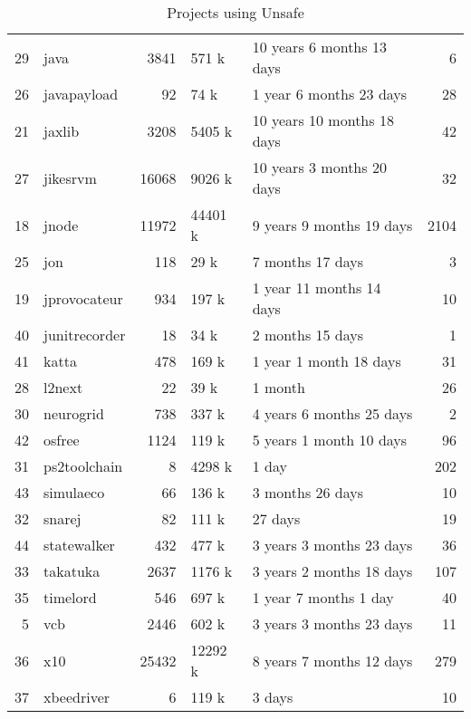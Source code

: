 \begin{table}[ht]
\begin{tabular}{rlrllr}
  29 & java & 3841 & 571 k & 10 years 6 months 13 days &   6 \\ 
  26 & javapayload &  92 & 74 k &  1 year 6 months 23 days &  28 \\ 
  21 & jaxlib & 3208 & 5405 k & 10 years 10 months 18 days &  42 \\ 
  27 & jikesrvm & 16068 & 9026 k & 10 years 3 months 20 days &  32 \\ 
  18 & jnode & 11972 & 44401 k & 9 years 9 months 19 days & 2104 \\ 
  25 & jon & 118 & 29 k &  7 months 17 days &   3 \\ 
  19 & jprovocateur & 934 & 197 k &  1 year 11 months 14 days &  10 \\ 
  40 & junitrecorder &  18 & 34 k &  2 months 15 days &   1 \\ 
  41 & katta & 478 & 169 k &  1 year 1 month 18 days &  31 \\ 
  28 & l2next &  22 & 39 k &  1 month &  26 \\ 
  30 & neurogrid & 738 & 337 k & 4 years 6 months 25 days &   2 \\ 
  42 & osfree & 1124 & 119 k & 5 years 1 month 10 days &  96 \\ 
  31 & ps2toolchain &   8 & 4298 k &  1 day & 202 \\ 
  43 & simulaeco &  66 & 136 k &  3 months 26 days &  10 \\ 
  32 & snarej &  82 & 111 k &  27 days &  19 \\ 
  44 & statewalker & 432 & 477 k & 3 years 3 months 23 days &  36 \\ 
  33 & takatuka & 2637 & 1176 k & 3 years 2 months 18 days & 107 \\ 
  35 & timelord & 546 & 697 k &  1 year 7 months 1 day &  40 \\ 
  5 & vcb & 2446 & 602 k & 3 years 3 months 23 days &  11 \\ 
  36 & x10 & 25432 & 12292 k & 8 years 7 months 12 days & 279 \\ 
  37 & xbeedriver &   6 & 119 k &  3 days &  10 \\ 
   \hline
\end{tabular}
\caption{Projects using Unsafe} 
\label{table:projects}
\end{table}
